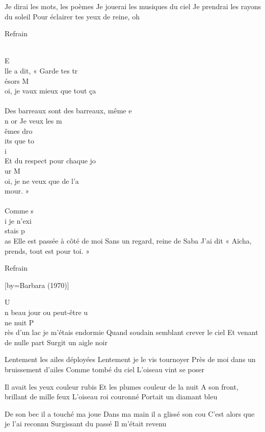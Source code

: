 \beginverse
Je dirai les mots, les poèmes 
Je jouerai les musiques du ciel 
Je prendrai les rayons du soleil 
Pour éclairer tes yeux de reine, oh\!
\endverse

\beginverse
Refrain
\endverse

\\[Misus4]E\\[Lam]lle a dit, « Garde tes tr\\[Fa]ésors
M\\[Lam]oi, je vaux mieux que tout ça\\[Fa]
\\[Rém]Des barreaux sont des barreaux, même e\\[Sol]n or
Je veux les m\\[Misus4]êmes dro\\[Mi]its que to\\[Lam]i
\\[Fa]Et du respect pour chaque jo\\[Rém]ur
M\\[Rém]oi, je ne veux que de l'a\\[Misus4]mour. »\\[Mi]

\\[Mim]Comme s\\[Do]i je n'exi\\[Sol]stais p\\[Ré]as
Elle est passée à côté de moi
Sans un regard, reine de Saba 
J'ai dit « Aïcha, prends, tout est pour toi. »

\beginverse
Refrain
\endverse

[by={Barbara (1970)}]

\beginverse
U\\[Ré]n beau jour ou peut-être u\\[La]ne nuit
P\\[Mim]rès d'un lac je m'étais endormie
Quand soudain semblant crever le ciel 
Et venant de nulle part
Surgit un aigle noir
\endverse

\beginverse
Lentement les ailes déployées
Lentement je le vis tournoyer
Près de moi dans un bruissement d'ailes
Comme tombé du ciel
L'oiseau vint se poser
\endverse

\beginverse
Il avait les yeux couleur rubis
Et les plumes couleur de la nuit
A son front, brillant de mille feux
L'oiseau roi couronné
Portait un diamant bleu
\endverse

\beginverse
De son bec il a touché ma joue
Dans ma main il a glissé son cou
C'est alors que je l'ai reconnu
Surgissant du passé
Il m'était revenu
\endverse

